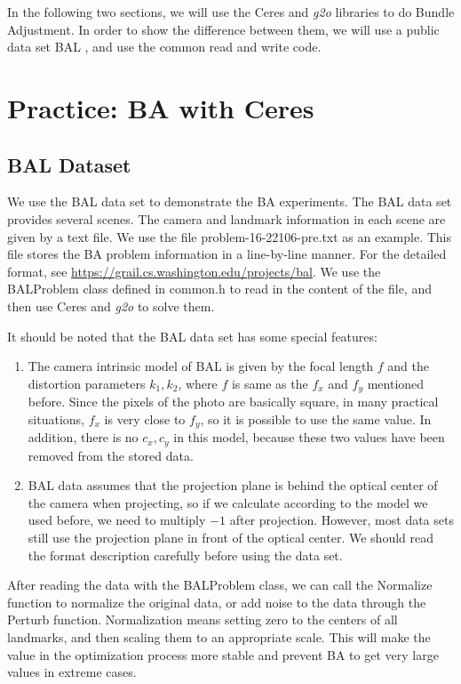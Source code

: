 In the following two sections, we will use the Ceres and \textit{g2o} libraries to do Bundle Adjustment. In order to show the difference between them, we will use a public data set BAL {\cite{bundleadjustmentinlarge}}, and use the common read and write code.

\section{Practice: BA with Ceres}
\subsection{BAL Dataset}
We use the BAL data set to demonstrate the BA experiments. The BAL data set provides several scenes. The camera and landmark information in each scene are given by a text file. We use the file problem-16-22106-pre.txt as an example. This file stores the BA problem information in a line-by-line manner. For the detailed format, see \url{https://grail.cs.washington.edu/projects/bal}. We use the BALProblem class defined in common.h to read in the content of the file, and then use Ceres and \textit{g2o} to solve them.

It should be noted that the BAL data set has some special features:
\begin{enumerate}
	\item  The camera intrinsic model of BAL is given by the focal length $f$ and the distortion parameters $k_1,k_2$, where $f$ is same as the $f_x$ and $f_y$ mentioned before. Since the pixels of the photo are basically square, in many practical situations, $f_x$ is very close to $f_y$, so it is possible to use the same value. In addition, there is no $c_x, c_y$ in this model, because these two values have been removed from the stored data.
	\item BAL data assumes that the projection plane is behind the optical center of the camera when projecting, so if we calculate according to the model we used before, we need to multiply $-1$ after projection. However, most data sets still use the projection plane in front of the optical center. We should read the format description carefully before using the data set.
\end{enumerate}

After reading the data with the BALProblem class, we can call the Normalize function to normalize the original data, or add noise to the data through the Perturb function. Normalization means setting zero to the centers of all landmarks, and then scaling them to an appropriate scale. This will make the value in the optimization process more stable and prevent BA to get very large values in extreme cases.

